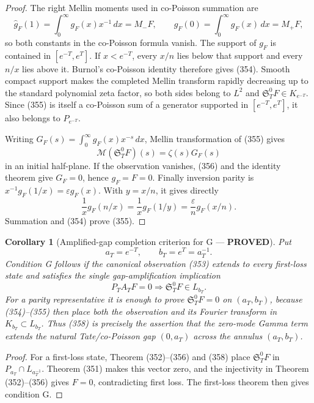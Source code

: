\documentclass[11pt]{article}
\newtheorem{corollary}[theorem]{Corollary}
\newcommand{\PROVED}{\textcolor{green!45!black}{\textbf{PROVED}}}
\begin{document}
\begin{proof}
The right Mellin moments used in co-Poisson summation are
\[
 \widehat g_F(1)=\int_0^\infty g_F(x)x^{-1}\,dx=M_-F,
 \qquad
 \widehat g_F(0)=\int_0^\infty g_F(x)\,dx=M_+F,
\]
so both constants in the co-Poisson formula vanish.  The support of $g_F$
is contained in $[e^{-T},e^T]$.  If $x<e^{-T}$, every $x/n$ lies below
that support and every $n/x$ lies above it.  Burnol's co-Poisson identity
therefore gives (354).  Smooth compact support makes the completed Mellin
transform rapidly decreasing up to the standard polynomial zeta factor, so
both sides belong to $L^2$ and $\mathfrak S_T^0F\in K_{e^{-T}}$.  Since
(355) is itself a co-Poisson sum of a generator supported in
$[e^{-T},e^T]$, it also belongs to $P_{e^{-T}}$.

Writing $G_F(s)=\int_0^\infty g_F(x)x^{-s}\,dx$, Mellin transformation of
(355) gives
\begin{equation}
 \mathcal M(\mathfrak S_T^0F)(s)=\zeta(s)G_F(s)       \tag{356}
\end{equation}
in an initial half-plane.  If the observation vanishes, (356) and the
identity theorem give $G_F=0$, hence $g_F=F=0$.  Finally inversion parity is
$x^{-1}g_F(1/x)=\varepsilon g_F(x)$.  With $y=x/n$, it gives directly
\[
 \frac1x g_F(n/x)=\frac1x g_F(1/y)
 =\frac{\varepsilon}{n}g_F(x/n).
\]
Summation and (354) prove (355).
\end{proof}

\begin{corollary}[Amplified-gap completion criterion for G --- \PROVED]
Put
\begin{equation}
 a_T=e^{-T},\qquad b_T=e^T=a_T^{-1}.                 \tag{357}
\end{equation}
Condition G follows if the canonical observation (353) extends to every
first-loss state and satisfies the single gap-amplification implication
\begin{equation}
 \boxed{P_TA_TF=0\Longrightarrow
        \mathfrak S_T^0F\in L_{b_T}.}                \tag{358}
\end{equation}
For a parity representative it is enough to prove
$\mathfrak S_T^0F=0$ on $(a_T,b_T)$, because (354)--(355) then place both
the observation and its Fourier transform in $K_{b_T}\subset L_{b_T}$.
Thus (358) is precisely the assertion that the zero-mode Gamma term extends
the natural Tate/co-Poisson gap $(0,a_T)$ across the annulus
$(a_T,b_T)$.
\end{corollary}

\begin{proof}
For a first-loss state, Theorem (352)--(356) and (358) place
$\mathfrak S_T^0F$ in
$P_{a_T}\cap L_{a_T^{-1}}$.  Theorem (351) makes this vector zero, and the
injectivity in Theorem (352)--(356) gives $F=0$, contradicting first loss.
The first-loss theorem then gives condition G.
\end{proof}
\end{document}
